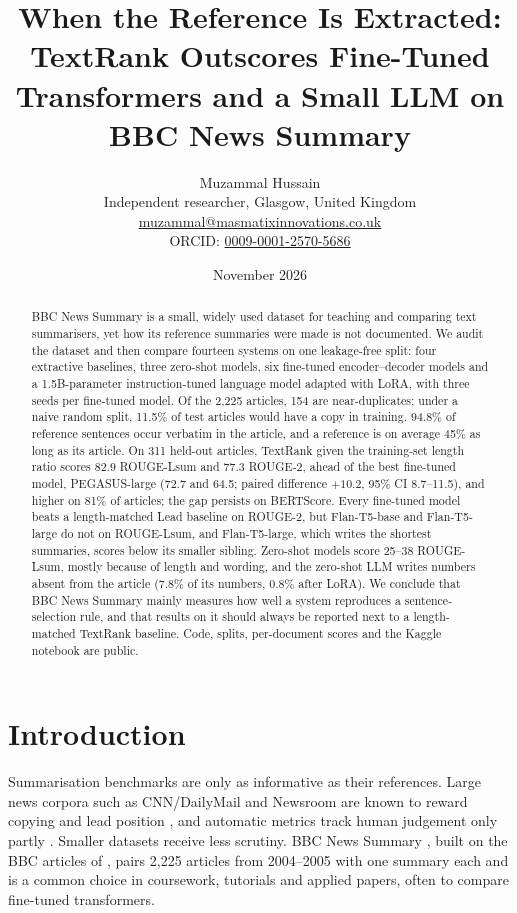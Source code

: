 \documentclass[11pt,a4paper]{article}
\title{When the Reference Is Extracted: TextRank Outscores Fine-Tuned Transformers and a Small LLM on BBC News Summary}
\author{Muzammal Hussain\\
\small Independent researcher, Glasgow, United Kingdom\\
\small \href{mailto:muzammal@masmatixinnovations.co.uk}{muzammal@masmatixinnovations.co.uk}\\
\small ORCID: \href{https://orcid.org/0009-0001-2570-5686}{0009-0001-2570-5686}}
\date{\small November 2026}
\begin{document}
\maketitle

\begin{abstract}
BBC News Summary is a small, widely used dataset for teaching and comparing text summarisers, yet how its reference summaries were made is not documented. We audit the dataset and then compare fourteen systems on one leakage-free split: four extractive baselines, three zero-shot models, six fine-tuned encoder--decoder models and a 1.5B-parameter instruction-tuned language model adapted with LoRA, with three seeds per fine-tuned model. Of the 2,225 articles, 154 are near-duplicates; under a naive random split, 11.5\% of test articles would have a copy in training. 94.8\% of reference sentences occur verbatim in the article, and a reference is on average 45\% as long as its article. On 311 held-out articles, TextRank given the training-set length ratio scores 82.9 ROUGE-Lsum and 77.3 ROUGE-2, ahead of the best fine-tuned model, PEGASUS-large (72.7 and 64.5; paired difference $+10.2$, 95\% CI 8.7--11.5), and higher on 81\% of articles; the gap persists on BERTScore. Every fine-tuned model beats a length-matched Lead baseline on ROUGE-2, but Flan-T5-base and Flan-T5-large do not on ROUGE-Lsum, and Flan-T5-large, which writes the shortest summaries, scores below its smaller sibling. Zero-shot models score 25--38 ROUGE-Lsum, mostly because of length and wording, and the zero-shot LLM writes numbers absent from the article (7.8\% of its numbers, 0.8\% after LoRA). We conclude that BBC News Summary mainly measures how well a system reproduces a sentence-selection rule, and that results on it should always be reported next to a length-matched TextRank baseline. Code, splits, per-document scores and the Kaggle notebook are public.
\end{abstract}

\section{Introduction}
Summarisation benchmarks are only as informative as their references. Large news corpora such as CNN/DailyMail \cite{hermann2015cnndm} and Newsroom \cite{grusky2018newsroom} are known to reward copying and lead position \cite{kryscinski2019critical,jung2019earlier}, and automatic metrics track human judgement only partly \cite{fabbri2021summeval}. Smaller datasets receive less scrutiny. BBC News Summary \cite{pariza2018bbcsum}, built on the BBC articles of \citet{greene2006bbc}, pairs 2,225 articles from 2004--2005 with one summary each and is a common choice in coursework, tutorials and applied papers, often to compare fine-tuned transformers.
\end{document}

